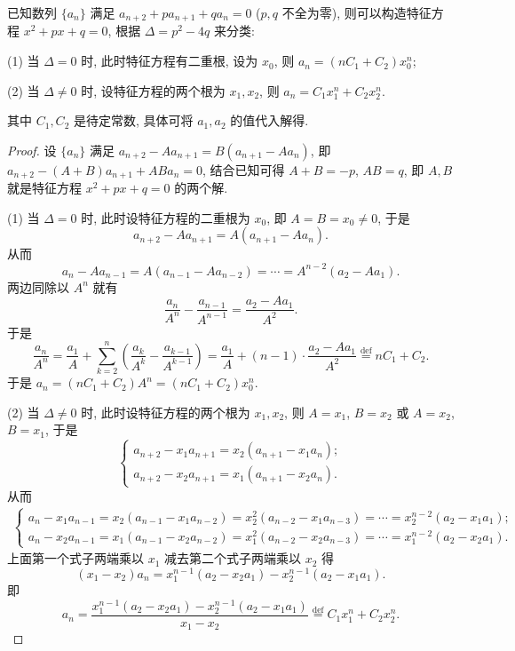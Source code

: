 \documentclass[../../main.tex]{subfiles}%
\begin{document}
\begin{proposition}\label{proposition:可直接求通项--类型二}
已知数列 $\{a_n\}$ 满足 $a_{n + 2} + p a_{n + 1} + q a_n = 0$ ($p, q$ 不全为零), 则可以构造特征方程 $x^2 + p x + q = 0$, 根据 $\Delta = p^2 - 4 q$ 来分类:

(1) 当 $\Delta = 0$ 时, 此时特征方程有二重根, 设为 $x_0$, 则 $a_n = (n C_1 + C_2) x_0^n$;

(2) 当 $\Delta \neq 0$ 时, 设特征方程的两个根为 $x_1, x_2$, 则 $a_n = C_1 x_1^n + C_2 x_2^n$.

其中 $C_1, C_2$ 是待定常数, 具体可将 $a_1, a_2$ 的值代入解得.
\end{proposition}
\begin{proof}
设 $\{a_n\}$ 满足 $a_{n + 2} - A a_{n + 1} = B(a_{n + 1} - A a_n)$, 即 $a_{n + 2} - (A + B) a_{n + 1} + A B a_n = 0$, 结合已知可得 $A + B = -p$, $A B = q$, 即 $A, B$ 就是特征方程 $x^2 + p x + q = 0$ 的两个解.

(1) 当 $\Delta = 0$ 时, 此时设特征方程的二重根为 $x_0$, 即 $A = B = x_0 \neq 0$, 于是
\[
a_{n + 2} - A a_{n + 1} = A(a_{n + 1} - A a_n).
\]
从而
\[
a_n - A a_{n - 1} = A(a_{n - 1} - A a_{n - 2}) = \cdots = A^{n - 2}(a_2 - A a_1).
\]
两边同除以 $A^n$ 就有
\[
\frac{a_n}{A^n} - \frac{a_{n - 1}}{A^{n - 1}} = \frac{a_2 - A a_1}{A^2}.
\]
于是
\[
\frac{a_n}{A^n} = \frac{a_1}{A} + \sum_{k = 2}^n \left( \frac{a_k}{A^k} - \frac{a_{k - 1}}{A^{k - 1}} \right) = \frac{a_1}{A} + (n - 1) \cdot \frac{a_2 - A a_1}{A^2} \stackrel{\text{def}}{=} n C_1 + C_2.
\]
于是 $a_n = (n C_1 + C_2) A^n = (n C_1 + C_2) x_0^n$.

(2) 当 $\Delta \neq 0$ 时, 此时设特征方程的两个根为 $x_1, x_2$, 则 $A = x_1$, $B = x_2$ 或 $A = x_2$, $B = x_1$, 于是
\[
\begin{cases} 
a_{n + 2} - x_1 a_{n + 1} = x_2(a_{n + 1} - x_1 a_n); \\
a_{n + 2} - x_2 a_{n + 1} = x_1(a_{n + 1} - x_2 a_n).
\end{cases}
\]
从而
\begin{align*}
\begin{cases}
a_n - x_1 a_{n - 1} = x_2(a_{n - 1} - x_1 a_{n - 2}) = x_2^2(a_{n - 2} - x_1 a_{n - 3}) = \cdots = x_2^{n - 2}(a_2 - x_1 a_1);\\
a_n - x_2 a_{n - 1} = x_1(a_{n - 1} - x_2 a_{n - 2}) = x_1^2(a_{n - 2} - x_2 a_{n - 3}) = \cdots = x_1^{n - 2}(a_2 - x_2 a_1).
\end{cases}
\end{align*}
上面第一个式子两端乘以 $x_1$ 减去第二个式子两端乘以 $x_2$ 得
\[
(x_1 - x_2) a_n = x_1^{n - 1}(a_2 - x_2 a_1) - x_2^{n - 1}(a_2 - x_1 a_1).
\]
即
\[
a_n = \frac{x_1^{n - 1}(a_2 - x_2 a_1) - x_2^{n - 1}(a_2 - x_1 a_1)}{x_1 - x_2} \stackrel{\text{def}}{=} C_1 x_1^n + C_2 x_2^n.
\]
\end{proof}
\end{document}
